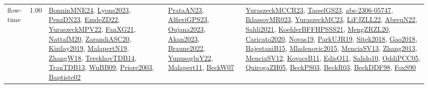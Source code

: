 {\begin{longtable}{p{3cm}r>{\raggedright\arraybackslash}p{6cm}>{\raggedright\arraybackslash}p{6cm}>{\raggedright\arraybackslash}p{8cm}}
\index{flow-time}\index{Concepts!flow-time}flow-time &  1.00 & \hyperref[detail:BonninMNE24]{BonninMNE24}, \hyperref[detail:Lyons2023]{Lyons2023}, \hyperref[detail:PenzDN23]{PenzDN23}, \hyperref[detail:EmdeZD22]{EmdeZD22}, \hyperref[detail:YuraszeckMPV22]{YuraszeckMPV22}, \hyperref[detail:FanXG21]{FanXG21}, \hyperref[detail:NattafM20]{NattafM20}, \hyperref[detail:ZarandiASC20]{ZarandiASC20}, \hyperref[detail:Kizilay2019]{Kizilay2019}, \hyperref[detail:MalapertN19]{MalapertN19}, \hyperref[detail:ZhangW18]{ZhangW18}, \hyperref[detail:TerekhovTDB14]{TerekhovTDB14}, \hyperref[detail:TranTDB13]{TranTDB13}, \hyperref[detail:WuBB09]{WuBB09}, \hyperref[detail:Priore2003]{Priore2003}, \hyperref[detail:Baptiste02]{Baptiste02} & \hyperref[detail:PrataAN23]{PrataAN23}, \hyperref[detail:AlfieriGPS23]{AlfieriGPS23}, \hyperref[detail:Oujana2023]{Oujana2023}, \hyperref[detail:Akan2023]{Akan2023}, \hyperref[detail:Braune2022]{Braune2022}, \hyperref[detail:YunusogluY22]{YunusogluY22}, \hyperref[detail:Malapert11]{Malapert11}, \hyperref[detail:BeckW07]{BeckW07} & \hyperref[detail:YuraszeckMCCR23]{YuraszeckMCCR23}, \hyperref[detail:TasselGS23]{TasselGS23}, \hyperref[detail:abs-2306-05747]{abs-2306-05747}, \hyperref[detail:IklassovMR023]{IklassovMR023}, \hyperref[detail:YuraszeckMC23]{YuraszeckMC23}, \hyperref[detail:LiFJZLL22]{LiFJZLL22}, \hyperref[detail:AbreuN22]{AbreuN22}, \hyperref[detail:Sahli2021]{Sahli2021}, \hyperref[detail:KoehlerBFFHPSSS21]{KoehlerBFFHPSSS21}, \hyperref[detail:MengZRZL20]{MengZRZL20}, \hyperref[detail:Caricato2020]{Caricato2020}, \hyperref[detail:Novas19]{Novas19}, \hyperref[detail:ParkUJR19]{ParkUJR19}, \hyperref[detail:Sitek2018]{Sitek2018}, \hyperref[detail:Gao2018]{Gao2018}, \hyperref[detail:BajestaniB15]{BajestaniB15}, \hyperref[detail:Mladenovic2015]{Mladenovic2015}, \hyperref[detail:MenciaSV13]{MenciaSV13}, \hyperref[detail:Zhang2013]{Zhang2013}, \hyperref[detail:MenciaSV12]{MenciaSV12}, \hyperref[detail:KovacsB11]{KovacsB11}, \hyperref[detail:EdisO11]{EdisO11}, \hyperref[detail:Salido10]{Salido10}, \hyperref[detail:OddiPCC05]{OddiPCC05}, \hyperref[detail:QuirogaZH05]{QuirogaZH05}, \hyperref[detail:BeckPS03]{BeckPS03}, \hyperref[detail:BeckR03]{BeckR03}, \hyperref[detail:BeckDDF98]{BeckDDF98}, \hyperref[detail:FoxS90]{FoxS90}\\

\end{longtable}}
